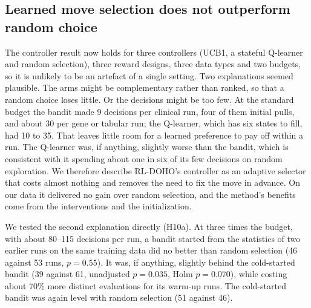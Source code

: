 \documentclass[journal]{IEEEtran}
\begin{document}
\subsection{Learned move selection does not outperform random choice}
The controller result now holds for three controllers (UCB1, a stateful Q-learner and random selection), three reward designs, three data types and two budgets, so it is unlikely to be an artefact of a single setting. Two explanations seemed plausible. The arms might be complementary rather than ranked, so that a random choice loses little. Or the decisions might be too few. At the standard budget the bandit made 9 decisions per clinical run, four of them initial pulls, and about 30 per gene or tabular run; the Q-learner, which has six states to fill, had 10 to 35. That leaves little room for a learned preference to pay off within a run. The Q-learner was, if anything, slightly worse than the bandit, which is consistent with it spending about one in six of its few decisions on random exploration. We therefore describe RL-DOHO's controller as an adaptive selector that costs almost nothing and removes the need to fix the move in advance. On our data it delivered no gain over random selection, and the method's benefits come from the interventions and the initialization.

We tested the second explanation directly (H10a). At three times the budget, with about 80--115 decisions per run, a bandit started from the statistics of two earlier runs on the same training data did no better than random selection (46 against 53 runs, $p=0.55$). It was, if anything, slightly behind the cold-started bandit (39 against 61, unadjusted $p=0.035$, Holm $p=0.070$), while costing about 70\% more distinct evaluations for its warm-up runs. The cold-started bandit was again level with random selection (51 against 46).
\end{document}
